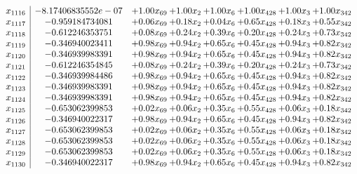 \documentclass[8pt]{article}
\begin{document}
\[\begin{array}{c| c c@{\hskip 2pt} c@{\hskip 2pt} c@{\hskip 2pt} c@{\hskip 2pt} c@{\hskip 2pt} c@{\hskip 2pt} }
 x_{1116}   &  -8.17406835552e-07 & +  1.00 x_{69} & +  1.00 x_{2} & +  1.00 x_{6} & +  1.00 x_{428} & +  1.00 x_{3} & +  1.00 x_{342}\\
 x_{1117}   &  -0.959184734081 & +  0.06 x_{69} & +  0.18 x_{2} & +  0.04 x_{6} & +  0.65 x_{428} & +  0.18 x_{3} & +  0.55 x_{342}\\
 x_{1118}   &  -0.612246353751 & +  0.08 x_{69} & +  0.24 x_{2} & +  0.39 x_{6} & +  0.20 x_{428} & +  0.24 x_{3} & +  0.73 x_{342}\\
 x_{1119}   &  -0.346940023411 & +  0.98 x_{69} & +  0.94 x_{2} & +  0.65 x_{6} & +  0.45 x_{428} & +  0.94 x_{3} & +  0.82 x_{342}\\
 x_{1120}   &  -0.346939983391 & +  0.98 x_{69} & +  0.94 x_{2} & +  0.65 x_{6} & +  0.45 x_{428} & +  0.94 x_{3} & +  0.82 x_{342}\\
 x_{1121}   &  -0.612246354845 & +  0.08 x_{69} & +  0.24 x_{2} & +  0.39 x_{6} & +  0.20 x_{428} & +  0.24 x_{3} & +  0.73 x_{342}\\
 x_{1122}   &  -0.346939984486 & +  0.98 x_{69} & +  0.94 x_{2} & +  0.65 x_{6} & +  0.45 x_{428} & +  0.94 x_{3} & +  0.82 x_{342}\\
 x_{1123}   &  -0.346939983391 & +  0.98 x_{69} & +  0.94 x_{2} & +  0.65 x_{6} & +  0.45 x_{428} & +  0.94 x_{3} & +  0.82 x_{342}\\
 x_{1124}   &  -0.346939983391 & +  0.98 x_{69} & +  0.94 x_{2} & +  0.65 x_{6} & +  0.45 x_{428} & +  0.94 x_{3} & +  0.82 x_{342}\\
 x_{1125}   &  -0.653062399853 & +  0.02 x_{69} & +  0.06 x_{2} & +  0.35 x_{6} & +  0.55 x_{428} & +  0.06 x_{3} & +  0.18 x_{342}\\
 x_{1126}   &  -0.346940022317 & +  0.98 x_{69} & +  0.94 x_{2} & +  0.65 x_{6} & +  0.45 x_{428} & +  0.94 x_{3} & +  0.82 x_{342}\\
 x_{1127}   &  -0.653062399853 & +  0.02 x_{69} & +  0.06 x_{2} & +  0.35 x_{6} & +  0.55 x_{428} & +  0.06 x_{3} & +  0.18 x_{342}\\
 x_{1128}   &  -0.653062399853 & +  0.02 x_{69} & +  0.06 x_{2} & +  0.35 x_{6} & +  0.55 x_{428} & +  0.06 x_{3} & +  0.18 x_{342}\\
 x_{1129}   &  -0.653062399853 & +  0.02 x_{69} & +  0.06 x_{2} & +  0.35 x_{6} & +  0.55 x_{428} & +  0.06 x_{3} & +  0.18 x_{342}\\
 x_{1130}   &  -0.346940022317 & +  0.98 x_{69} & +  0.94 x_{2} & +  0.65 x_{6} & +  0.45 x_{428} & +  0.94 x_{3} & +  0.82 x_{342}\\

\end{array}\]
\end{document}
